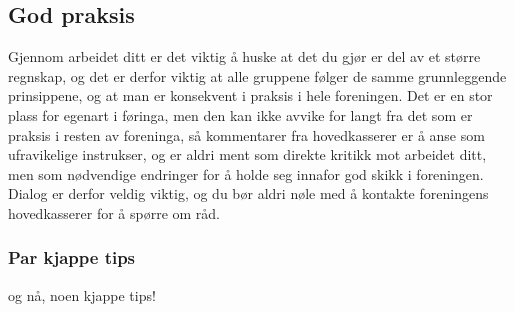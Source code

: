 \subsection*{God praksis}
Gjennom arbeidet ditt er det viktig å huske at det du gjør er del av et større regnskap, og det er derfor viktig at alle gruppene følger de samme grunnleggende prinsippene, og at man er konsekvent i praksis i hele foreningen. Det er en stor plass for egenart i føringa, men den kan ikke avvike for langt fra det som er praksis i resten av foreninga, så kommentarer fra hovedkasserer er å anse som ufravikelige instrukser, og er aldri ment som direkte kritikk mot arbeidet ditt, men som nødvendige endringer for å holde seg innafor god skikk i foreningen. Dialog er derfor veldig viktig, og du bør aldri nøle med å kontakte foreningens hovedkasserer for å spørre om råd.

\subsubsection*{Par kjappe tips}
og nå, noen kjappe tips!

